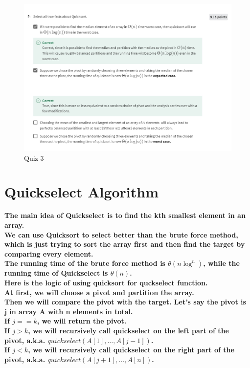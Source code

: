\documentclass{article}
\begin{document}
\begin{figure}[H]
    \includegraphics[width=\textwidth]{quicksortanalysisquiz3.png}
    \caption{Quiz 3\\}
\end{figure}


\section{Quickselect Algorithm}

\paragraph{The main idea of Quickselect is to find the kth smallest element in an array.\\
We can use Quicksort to select better than the brute force method, which is just trying to
sort the array first and then find the target by comparing every element.\\
The running time of the brute force method is $\theta(n\log^n)$, 
while the running time of Quickselect is $\theta(n)$.\\
Here is the logic of using quicksort for quckselect function.\\
At first, we will choose a pivot and partition the array.\\
Then we will compare the pivot with the target.
Let's say the pivot is j in array A with n elements in total.\\
If $j == k$, we will return the pivot.\\
If $j > k$, we will recursively call quickselect on the left part of the pivot,
a.k.a. $quickselect(A[1], \ldots ,A[j-1])$.\\
If $j < k$, we will recursively call quickselect on the right part of the pivot,
a.k.a. $quickselect(A[j+1], \ldots ,A[n])$.\\}
\end{document}

